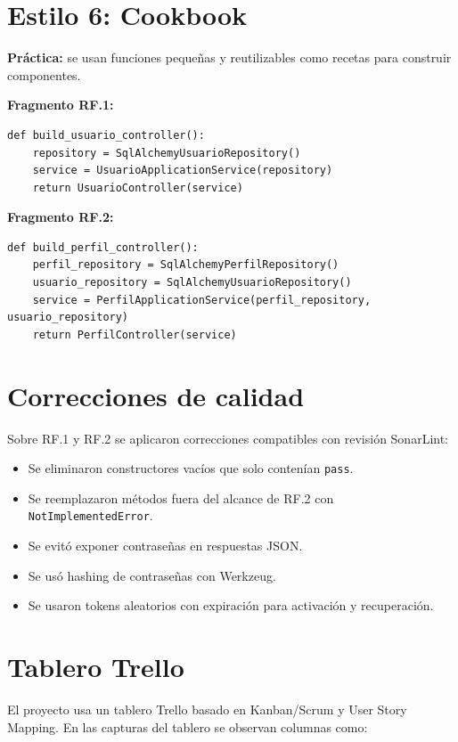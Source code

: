 \documentclass[12pt,a4paper]{article}
\begin{document}
\section{Estilo 6: Cookbook}

\textbf{Práctica:} se usan funciones pequeñas y reutilizables como recetas para construir componentes.

\textbf{Fragmento RF.1:}

\begin{lstlisting}[style=pythonstyle]
def build_usuario_controller():
    repository = SqlAlchemyUsuarioRepository()
    service = UsuarioApplicationService(repository)
    return UsuarioController(service)
\end{lstlisting}

\textbf{Fragmento RF.2:}

\begin{lstlisting}[style=pythonstyle]
def build_perfil_controller():
    perfil_repository = SqlAlchemyPerfilRepository()
    usuario_repository = SqlAlchemyUsuarioRepository()
    service = PerfilApplicationService(perfil_repository, usuario_repository)
    return PerfilController(service)
\end{lstlisting}

\section{Correcciones de calidad}

Sobre RF.1 y RF.2 se aplicaron correcciones compatibles con revisión SonarLint:

\begin{itemize}
    \item Se eliminaron constructores vacíos que solo contenían \texttt{pass}.
    \item Se reemplazaron métodos fuera del alcance de RF.2 con \texttt{NotImplementedError}.
    \item Se evitó exponer contraseñas en respuestas JSON.
    \item Se usó hashing de contraseñas con Werkzeug.
    \item Se usaron tokens aleatorios con expiración para activación y recuperación.
\end{itemize}

\section{Tablero Trello}

El proyecto usa un tablero Trello basado en Kanban/Scrum y User Story Mapping. En las capturas del tablero se observan columnas como:
\end{document}
